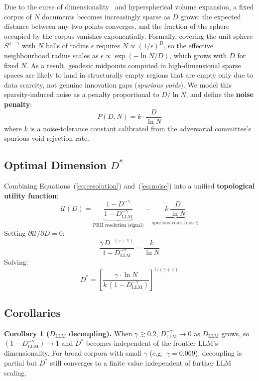 \documentclass[11pt,twocolumn]{article}
\begin{document}
Due to the curse of dimensionality~\cite{beyer1999nearest} and
hyperspherical volume expansion, a fixed corpus of $N$ documents
becomes increasingly sparse as $D$ grows: the expected distance
between any two points converges, and the fraction of the sphere
occupied by the corpus vanishes exponentially.  Formally, covering
the unit sphere $S^{d-1}$ with $N$ balls of radius $\epsilon$
requires $N \propto (1/\epsilon)^D$, so the effective neighbourhood
radius scales as $\epsilon \propto \exp(-\ln N / D)$, which grows
with $D$ for fixed $N$.  As a result, geodesic midpoints computed
in high-dimensional sparse spaces are likely to land in structurally
empty regions that are empty only due to data scarcity, not genuine
innovation gaps (\emph{spurious voids}).
We model this sparsity-induced noise as a penalty proportional to
$D / \ln N$, and define the \textbf{noise penalty}:
\begin{equation}
  P(D, N) = k \cdot \frac{D}{\ln N}
  \label{eq:noise}
\end{equation}
where $k$ is a noise-tolerance constant calibrated from the
adversarial committee's spurious-void rejection rate.

\subsection{Optimal Dimension $D^*$}

Combining Equations~(\ref{eq:resolution}) and~(\ref{eq:noise}) into a
unified \textbf{topological utility function}:
\[
  \mathcal{U}(D) =
  \underbrace{\frac{1 - D^{-\gamma}}{1 - D_{\mathrm{LLM}}^{-\gamma}}}_{\text{PRH resolution (signal)}}
  -
  \underbrace{k\,\frac{D}{\ln N}}_{\text{spurious voids (noise)}}
\]
Setting $\partial\mathcal{U}/\partial D = 0$:
\[
  \frac{\gamma\,D^{-(\gamma+1)}}{1 - D_{\mathrm{LLM}}^{-\gamma}} = \frac{k}{\ln N}
\]
Solving:
\begin{equation}
  \boxed{D^* = \left[\frac{\gamma \cdot \ln N}{k\,(1 - D_{\mathrm{LLM}}^{-\gamma})}\right]^{\!1/(\gamma+1)}}
  \label{eq:dstar}
\end{equation}

\subsection{Corollaries}

\textbf{Corollary 1 ($D_{\mathrm{LLM}}$ decoupling).}
When $\gamma \gtrsim 0.2$, $D_{\mathrm{LLM}}^{-\gamma} \to 0$ as
$D_{\mathrm{LLM}}$ grows, so $(1 - D_{\mathrm{LLM}}^{-\gamma}) \to 1$
and $D^*$ becomes independent of the frontier LLM's dimensionality.
For broad corpora with small $\gamma$ (e.g.\ $\gamma = 0.069$),
decoupling is partial but $D^*$ still converges to a finite value
independent of further LLM scaling.
\end{document}
